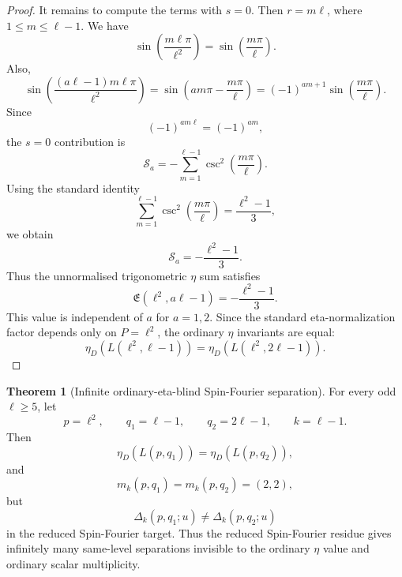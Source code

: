 \documentclass{article}
\theoremstyle{definition}
\newtheorem{theorem}{Theorem}[section]
\numberwithin{equation}{section}
\begin{document}
\begin{proof}
It remains to compute the terms with $s=0$.  Then $r=m\ell$, where $1\leq m\leq\ell-1$.  We have
\begin{equation}
\sin\left(\frac{m\ell\pi}{\ell^2}\right)=\sin\left(\frac{m\pi}{\ell}\right).
\end{equation}
Also,
\begin{equation}
\sin\left(\frac{(a\ell-1)m\ell\pi}{\ell^2}\right)
=
\sin\left(am\pi-\frac{m\pi}{\ell}\right)
=
(-1)^{am+1}\sin\left(\frac{m\pi}{\ell}\right).
\end{equation}
Since
\begin{equation}
(-1)^{a m\ell}=(-1)^{am},
\end{equation}
the $s=0$ contribution is
\begin{equation}
\mathcal S_a
=
-\sum_{m=1}^{\ell-1}\operatorname{csc}^2\left(\frac{m\pi}{\ell}\right).
\end{equation}
Using the standard identity
\begin{equation}
\sum_{m=1}^{\ell-1}\operatorname{csc}^2\left(\frac{m\pi}{\ell}\right)=\frac{\ell^2-1}{3},
\end{equation}
we obtain
\begin{equation}
\mathcal S_a=-\frac{\ell^2-1}{3}.
\end{equation}
Thus the unnormalised trigonometric $\eta$ sum satisfies
\begin{equation}
\mathfrak E(\ell^2,a\ell-1)=-\frac{\ell^2-1}{3}.
\end{equation}
This value is independent of $a$ for $a=1,2$.  Since the standard eta-normalization factor depends only on $P=\ell^2$, the ordinary $\eta$ invariants are equal:
\begin{equation}
\eta_D(L(\ell^2,\ell-1))=\eta_D(L(\ell^2,2\ell-1)).
\end{equation}
\end{proof}

\begin{theorem}[Infinite ordinary-eta-blind Spin-Fourier separation]
For every odd $\ell\geq 5$, let
\begin{equation}
p=\ell^2,
\qquad
q_1=\ell-1,
\qquad
q_2=2\ell-1,
\qquad
k=\ell-1.
\end{equation}
Then
\begin{equation}
\eta_D(L(p,q_1))=\eta_D(L(p,q_2)),
\end{equation}
and
\begin{equation}
m_k(p,q_1)=m_k(p,q_2)=(2,2),
\end{equation}
but
\begin{equation}
\Delta_k(p,q_1;u)\neq \Delta_k(p,q_2;u)
\end{equation}
in the reduced Spin-Fourier target.  Thus the reduced Spin-Fourier residue gives infinitely many same-level separations invisible to the ordinary $\eta$ value and ordinary scalar multiplicity.
\end{theorem}
\end{document}
